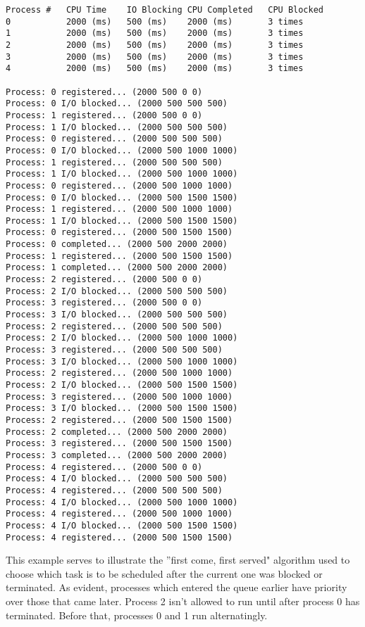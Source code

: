\documentclass{article}
\begin{document}
	    \begin{verbatim}
Process #	CPU Time	IO Blocking	CPU Completed	CPU Blocked
0			2000 (ms)	500 (ms)	2000 (ms)		3 times
1			2000 (ms)	500 (ms)	2000 (ms)		3 times
2			2000 (ms)	500 (ms)	2000 (ms)		3 times
3			2000 (ms)	500 (ms)	2000 (ms)		3 times
4			2000 (ms)	500 (ms)	2000 (ms)		3 times

Process: 0 registered... (2000 500 0 0)
Process: 0 I/O blocked... (2000 500 500 500)
Process: 1 registered... (2000 500 0 0)
Process: 1 I/O blocked... (2000 500 500 500)
Process: 0 registered... (2000 500 500 500)
Process: 0 I/O blocked... (2000 500 1000 1000)
Process: 1 registered... (2000 500 500 500)
Process: 1 I/O blocked... (2000 500 1000 1000)
Process: 0 registered... (2000 500 1000 1000)
Process: 0 I/O blocked... (2000 500 1500 1500)
Process: 1 registered... (2000 500 1000 1000)
Process: 1 I/O blocked... (2000 500 1500 1500)
Process: 0 registered... (2000 500 1500 1500)
Process: 0 completed... (2000 500 2000 2000)
Process: 1 registered... (2000 500 1500 1500)
Process: 1 completed... (2000 500 2000 2000)
Process: 2 registered... (2000 500 0 0)
Process: 2 I/O blocked... (2000 500 500 500)
Process: 3 registered... (2000 500 0 0)
Process: 3 I/O blocked... (2000 500 500 500)
Process: 2 registered... (2000 500 500 500)
Process: 2 I/O blocked... (2000 500 1000 1000)
Process: 3 registered... (2000 500 500 500)
Process: 3 I/O blocked... (2000 500 1000 1000)
Process: 2 registered... (2000 500 1000 1000)
Process: 2 I/O blocked... (2000 500 1500 1500)
Process: 3 registered... (2000 500 1000 1000)
Process: 3 I/O blocked... (2000 500 1500 1500)
Process: 2 registered... (2000 500 1500 1500)
Process: 2 completed... (2000 500 2000 2000)
Process: 3 registered... (2000 500 1500 1500)
Process: 3 completed... (2000 500 2000 2000)
Process: 4 registered... (2000 500 0 0)
Process: 4 I/O blocked... (2000 500 500 500)
Process: 4 registered... (2000 500 500 500)
Process: 4 I/O blocked... (2000 500 1000 1000)
Process: 4 registered... (2000 500 1000 1000)
Process: 4 I/O blocked... (2000 500 1500 1500)
Process: 4 registered... (2000 500 1500 1500)
    \end{verbatim}
	
	This example serves to illustrate the ''first come, first served" algorithm
	used to choose which task is to be scheduled after the current one was
	blocked or terminated. As evident, processes which entered the queue earlier
	have priority over those that came later. Process 2 isn't allowed to run
	until after process 0 has terminated. Before that, processes 0 and 1 run
	alternatingly.
	
\end{document}
